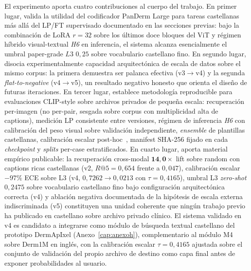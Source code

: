 El experimento aporta cuatro contribuciones al cuerpo del
trabajo. En primer lugar, valida la utilidad del codificador
PanDerm Large para tareas castellanas más allá del LP/FT
supervisado documentado en las secciones previas: bajo la
combinación de LoRA $r=32$ sobre los últimos doce bloques del
ViT y régimen híbrido visual-textual \emph{H6} en inferencia, el
sistema alcanza esencialmente el umbral paper-grade $L3$
$0{,}25$ sobre vocabulario castellano fino. En segundo lugar,
disocia experimentalmente capacidad arquitectónica de escala de
datos sobre el mismo corpus: la primera demuestra ser palanca
efectiva (v3$\to$v4) y la segunda \emph{flat-to-negative}
(v4$\to$v5), un resultado negativo honesto que orienta el diseño
de futuras iteraciones. En tercer lugar, establece metodología
reproducible para evaluaciones CLIP-style sobre archivos
privados de pequeña escala: recuperación per-imagen (no
per-pair, sesgada sobre corpus con multiplicidad alta de
captions), medición LP consistente entre versiones, régimen de
inferencia \emph{H6} con calibración del peso visual sobre
validación independiente, \emph{ensemble} de plantillas
castellanas, calibración escalar post-hoc~\cite{guo2017},
manifest SHA-256 fijado en cada \emph{checkpoint} y
\emph{splits} per-case estratificados. En cuarto lugar, aporta
material empírico publicable: la recuperación cross-modal
$\mathbf{14{,}0\times}$ lift sobre random con captions ricas
castellanas (v2, $R@5 = 0{,}654$ frente a $0{,}047$), calibración
escalar $-97\%$ ECE sobre L3 (v4, $0{,}7262 \to 0{,}0213$ con
$\tau = 0{,}4165$), umbral L3 \emph{zero-shot} $0{,}2475$ sobre
vocabulario castellano fino bajo configuración arquitectónica
correcta (v4) y ablación negativa documentada de la hipótesis de
escala externa indiscriminada (v5) constituyen una unidad
coherente que ningún trabajo previo ha publicado en castellano
sobre archivo privado clínico. El sistema validado en v4 es
candidato a integrarse como módulo de búsqueda textual castellano
del prototipo DermApIxel (Anexo~\ref{cap:anexoh}), complementario
al módulo M4 sobre Derm1M en inglés, con la calibración escalar
$\tau = 0{,}4165$ ajustada sobre el conjunto de validación del
propio archivo de destino como capa final antes de exponer
probabilidades al usuario.
